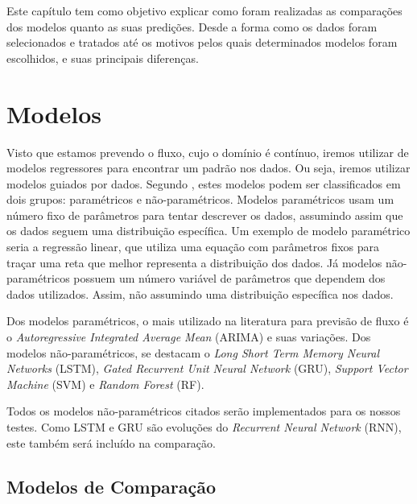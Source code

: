 

Este capítulo tem como objetivo explicar como foram realizadas as comparações dos modelos quanto as suas predições. Desde a forma como os dados foram selecionados e tratados até os motivos pelos quais determinados modelos foram escolhidos, e suas principais diferenças. 

\section{Modelos}

Visto que estamos prevendo o fluxo, cujo o domínio é contínuo, iremos utilizar de modelos regressores para encontrar um padrão nos dados. Ou seja, iremos utilizar modelos guiados por dados. Segundo \cite{parametric}, estes modelos podem ser classificados em dois grupos: paramétricos e não-paramétricos. Modelos paramétricos usam um número fixo de parâmetros para tentar descrever os dados, assumindo assim que os dados seguem uma distribuição específica. Um exemplo de modelo paramétrico seria a regressão linear, que utiliza uma equação com parâmetros fixos para traçar uma reta que melhor representa a distribuição dos dados. Já modelos não-paramétricos possuem um número variável de parâmetros que dependem dos dados utilizados. Assim, não assumindo uma distribuição específica nos dados.

Dos modelos paramétricos, o mais utilizado na literatura para previsão de fluxo é o \textit{Autoregressive Integrated Average Mean} (ARIMA) e suas variações. Dos modelos não-paramétricos, se destacam o \textit{Long Short Term Memory Neural Networks} (LSTM), \textit{Gated Recurrent Unit Neural Network} (GRU), \textit{Support Vector Machine} (SVM) e \textit{Random Forest} (RF). 

Todos os modelos não-paramétricos citados serão implementados para os nossos testes. Como LSTM e GRU são evoluções do \textit{Recurrent Neural Network} (RNN), este também será incluído na comparação. 

\subsection{Modelos de Comparação}

